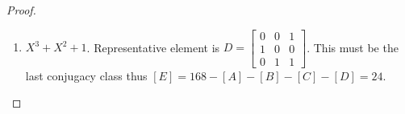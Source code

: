 \documentclass{article}
\newcommand{\Z}{\mathbb{Z}}
\begin{document}
\begin{proof}
\begin{enumerate}
        Suppose $\begin{bmatrix}
            a & b & c \\ d & e & f \\ g & h & i
        \end{bmatrix} \in \Z\left(D\right)$. Then $\begin{bmatrix}
            a & b & c \\ d & e & f \\ g & h & i
        \end{bmatrix} D = D \begin{bmatrix}
            a & b & c \\ d & e & f \\ g & h & i
        \end{bmatrix}$. Thus $\begin{bmatrix}
            g & h & i \\ a + g & b + h & c + i \\ a + d & b + e & c + f
        \end{bmatrix} = \begin{bmatrix}
            b + c & c & a + b \\ f + e & f & d + e \\ h + i & i & g + h
        \end{bmatrix}$. Thus matrices have the form, $\begin{bmatrix}
            a & b & c \\ b & a & b + c \\ b + c & c & a +b
        \end{bmatrix}$ and the determinant must be 1, so $a(a(a + b) - c(b + c)) - b(b(a + b) - (b + c)^2) + c(bc - ab - ac) = a(a^2 + ab - bc - c^2) - b(ab + b^2 - b^2 - 2bc - c^2) + c(bc - ab - ac) = a(a^2 + ab - bc - c^2) - b(ab - 2bc - c^2) + c(bc - ab - ac) = a^3 + a^2b - abc - ac^2 - ab^2 + 2b^2c + bc^2 + bc^2 - abc - ac^2 = a^3 + a^2b = a^3 - ab^2 + a^2b - 2ac^2 + 2bc^2 + 2b^2c - 2abc$ which is nonzero unless $a = b =c = 0$. Thus there are 7 possibilities for the matrices. Thus $Z(D) = 7$ and $[D] = \frac{168}{7} = 24$
        
        \item $X^3 + X^2 + 1$. Representative element is  $D = \begin{bmatrix}
            0 & 0 & 1 \\ 1 & 0 & 0 \\ 0 & 1 & 1
        \end{bmatrix}$. This must be the last conjugacy class thus $[E] = 168 - [A] - [B] - [C] - [D] = 24$.  
    \end{enumerate}    
\end{proof}
\end{document}
